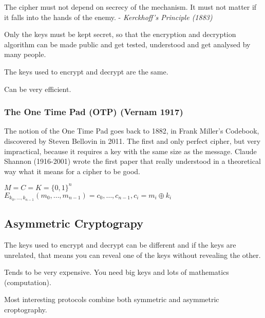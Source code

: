 \documentclass[12pt]{article}
\begin{document}
The cipher must not depend on secrecy of the mechanism. It must not matter if it falls into the hands of the enemy. - \textit{Kerckhoff's Principle (1883)}

Only the keys must be kept secret, so that the encryption and decryption algorithm can be made public and get tested, understood and get analysed by many people.

\begin{list}{*}{
\setlength{\itemsep}{0pt}
\setlength{\parsep}{0pt}
\setlength{\topsep}{0pt}
\setlength{\partopsep}{0pt}
\setlength{\leftmargin}{2em}
\setlength{\labelwidth}{1.5em}
\setlength{\labelsep}{0.5em}
}
\item The keys used to encrypt and decrypt are the same.
\item Can be very efficient. 
\end{list}

\subsubsection{The One Time Pad (OTP) (Vernam 1917)}

The notion of the One Time Pad goes back to 1882, in Frank Miller's Codebook, discovered by Steven Bellovin in 2011.
The first and only perfect cipher, but very impractical, because it requires a key with the same size as the message.
Claude Shannon (1916-2001) wrote the first paper that really understood in a theoretical way what it means for a cipher to be good.

$M = C = K = \{0,1\}^n$ \\
$E_{k_0,\dots,k_{n-1}}(m_0,\dots,m_{n-1}) = c_0,\dots,c_{n-1}, c_i = m_i \oplus k_i$



\subsection{Asymmetric Cryptograpy}

\begin{list}{*}{
\setlength{\itemsep}{0pt}
\setlength{\parsep}{0pt}
\setlength{\topsep}{0pt}
\setlength{\partopsep}{0pt}
\setlength{\leftmargin}{2em}
\setlength{\labelwidth}{1.5em}
\setlength{\labelsep}{0.5em}
}
\item The keys used to encrypt and decrypt can be different and if the keys are unrelated, that means you can reveal one of the keys without revealing the other.
\item Tends to be very expensive. You need big keys and lots of mathematics (computation). 
\item Most interesting protocols combine both symmetric and asymmetric croptography.
\end{list}
\end{document}
